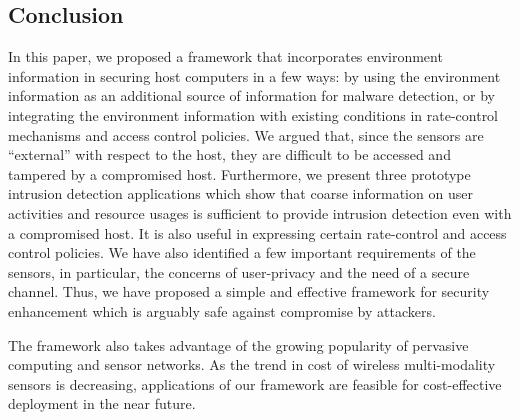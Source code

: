 \subsection{Conclusion}
\label{sec:conclusion}

In this paper, we proposed a framework that incorporates environment
information in securing host computers in a few ways: by using the
environment information as an additional source of information for
malware detection, or by integrating the environment information
with existing conditions in rate-control mechanisms and access
control policies.   We argued that, since the sensors are
``external'' with respect to the host, they are difficult to be
accessed and tampered by a compromised host. Furthermore, 
we present three prototype intrusion detection applications which show that
coarse information on user activities and resource usages is
sufficient to provide intrusion detection even with a compromised host.
It is also useful in expressing certain rate-control and access control
policies. We have also identified a few important requirements of
the sensors, in particular, the concerns of user-privacy and the
need of a secure channel. Thus, we have proposed a simple and
effective framework for security enhancement which is arguably safe
against compromise by attackers.

The framework also takes advantage of the growing popularity of
pervasive computing and sensor networks.  As the trend in cost of wireless
multi-modality sensors is decreasing, applications of our framework are
feasible for cost-effective deployment in the near future.
